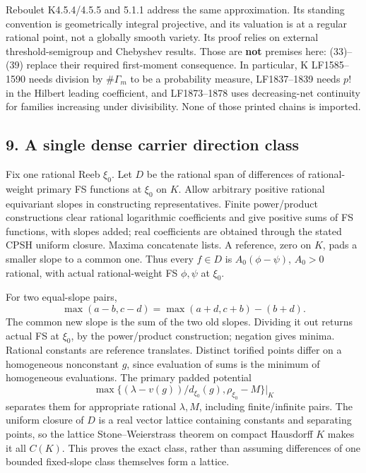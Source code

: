 \documentclass[
  10pt,
]{article}
\begin{document}
Reboulet K4.5.4/4.5.5 and 5.1.1 address the same approximation. Its
standing convention is geometrically integral projective, and its
valuation is at a regular rational point, not a globally smooth variety.
Its proof relies on external threshold-semigroup and Chebyshev results.
Those are \textbf{not} premises here: (33)--(39) replace their required
first-moment consequence. In particular, K LF1585--1590 needs division
by \(\#\Gamma_m\) to be a probability measure, LF1837--1839 needs \(p!\)
in the Hilbert leading coefficient, and LF1873--1878 uses decreasing-net
continuity for families increasing under divisibility. None of those
printed chains is imported.

\subsection{9. A single dense carrier direction
class}\label{a-single-dense-carrier-direction-class}

Fix one rational Reeb \(\xi_0\). Let \(D\) be the rational span of
differences of rational-weight primary FS functions at \(\xi_0\) on
\(K\). Allow arbitrary positive rational equivariant slopes in
constructing representatives. Finite power/product constructions clear
rational logarithmic coefficients and give positive sums of FS
functions, with slopes added; real coefficients are obtained through the
stated CPSH uniform closure. Maxima concatenate lists. A reference, zero
on \(K\), pads a smaller slope to a common one. Thus every \(f\in D\) is
\(A_0(\phi-\psi)\), \(A_0>0\) rational, with actual rational-weight FS
\(\phi,\psi\) at \(\xi_0\).

For two equal-slope pairs, \[ \max(a-b,c-d)=\max(a+d,c+b)-(b+d). \] The
common new slope is the sum of the two old slopes. Dividing it out
returns actual FS at \(\xi_0\), by the power/product construction;
negation gives minima. Rational constants are reference translates.
Distinct torified points differ on a homogeneous nonconstant \(g\),
since evaluation of sums is the minimum of homogeneous evaluations. The
primary padded potential
\[ \max\{(\lambda-v(g))/d_{\xi_0}(g),\rho_{\xi_0}-M\}\big|_K \]
separates them for appropriate rational \(\lambda,M\), including
finite/infinite pairs. The uniform closure of \(D\) is a real vector
lattice containing constants and separating points, so the lattice
Stone--Weierstrass theorem on compact Hausdorff \(K\) makes it all
\(C(K)\). This proves the exact class, rather than assuming differences
of one bounded fixed-slope class themselves form a lattice.
\end{document}

